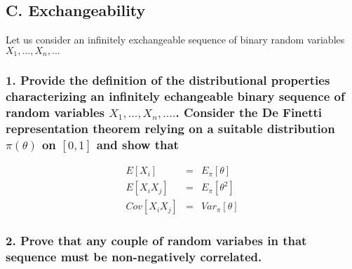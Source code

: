 \documentclass[
]{article}
\begin{document}
\newpage

\hypertarget{c.-exchangeability}{%
\subsection{C. Exchangeability}\label{c.-exchangeability}}

Let us consider an infinitely exchangeable sequence of binary random
variables \(X_1,...,X_n,...\)

\hypertarget{provide-the-definition-of-the-distributional-properties-characterizing-an-infinitely-echangeable-binary-sequence-of-random-variables-x_1-...x_n-.....-consider-the-de-finetti-representation-theorem-relying-on-a-suitable-distribution-pitheta-on-01-and-show-that}{%
\subsubsection{\texorpdfstring{1. Provide the definition of the
distributional properties characterizing an infinitely echangeable
binary sequence of random variables \(X_1, ...,X_n, ....\). Consider the
De Finetti representation theorem relying on a suitable distribution
\(\pi(\theta)\) on \([0,1]\) and show
that}{1. Provide the definition of the distributional properties characterizing an infinitely echangeable binary sequence of random variables X\_1, ...,X\_n, ..... Consider the De Finetti representation theorem relying on a suitable distribution \textbackslash pi(\textbackslash theta) on {[}0,1{]} and show that}}\label{provide-the-definition-of-the-distributional-properties-characterizing-an-infinitely-echangeable-binary-sequence-of-random-variables-x_1-...x_n-.....-consider-the-de-finetti-representation-theorem-relying-on-a-suitable-distribution-pitheta-on-01-and-show-that}}

\begin{eqnarray*} 
E[X_i]&=&E_{\pi}[\theta]\\
E[X_i X_j] &=& E_{\pi}[\theta^2]\\
Cov[X_i X_j] &=& Var_{\pi}[\theta]
\end{eqnarray*}

\hypertarget{prove-that-any-couple-of-random-variabes-in-that-sequence-must-be-non-negatively-correlated.}{%
\subsubsection{2. Prove that any couple of random variabes in that
sequence must be non-negatively
correlated.}\label{prove-that-any-couple-of-random-variabes-in-that-sequence-must-be-non-negatively-correlated.}}
\end{document}
